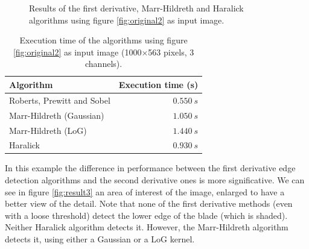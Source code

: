 \documentclass{ipol}
\numberwithin{equation}{section}
\numberwithin{table}{section}
\numberwithin{figure}{section}
\begin{document}
\begin{figure}[h!]
	\quad
	\caption{Results of the first derivative, Marr-Hildreth and Haralick algorithms using figure \ref{fig:original2} as input image.}
	\label{fig:result2}
\end{figure}

\begin{table}[h!]
	\begin{center}
	\begin{tabular}{| l | r |}
		\hline \rule{0pt}{3ex}
		\cellcolor[gray]{0.8} \textbf{Algorithm}	& \cellcolor[gray]{0.8} \textbf{Execution time (s)}	\\ \hline \rule{0pt}{3ex}
		Roberts, Prewitt and Sobel					& $0.550 \ s$										\\ \hline \rule{0pt}{3ex}
		Marr-Hildreth (Gaussian)					& $1.050 \ s$										\\ \hline \rule{0pt}{3ex}
		Marr-Hildreth (LoG)							& $1.440 \ s$										\\ \hline \rule{0pt}{3ex}
		Haralick									& $0.930 \ s$										\\
		\hline
	\end{tabular}
	\end{center}
	\caption{Execution time of the algorithms using figure \ref{fig:original2} as input image (1000$\times$563 pixels, 3 channels).}
	\label{exectime2}
\end{table}

In this example the difference in performance between the first derivative edge detection algorithms and the second derivative ones is more significative. We can see in figure \ref{fig:result3} an area of ​​interest of the image, enlarged to have a better view of the detail. Note that none of the first derivative methods (even with a loose threshold) detect the lower edge of the blade (which is shaded). Neither Haralick algorithm detects it. However, the Marr-Hildreth algorithm detects it, using either a Gaussian or a LoG kernel. \\
\end{document}
